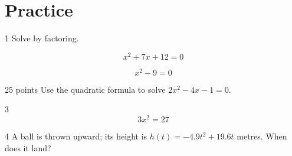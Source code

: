 \documentclass[11pt]{article}
\title{#1}\author{#2}\date{}%
\begin{document}

\section*{Practice}

\begin{clproblem}{1}{}
Solve by factoring.

\begin{clparts}
\item
\[
x^{2} + 7x + 12 = 0
\]
\item
\[
x^{2} - 9 = 0
\]
\end{clparts}
\end{clproblem}

\begin{clproblem}{2}{5 points}
Use the quadratic formula to solve \(2x^{2} - 4x - 1 = 0\).

\end{clproblem}

\begin{clproblem}{3}{}
\[
3x^{2} = 27
\]
\end{clproblem}

\begin{clproblem}{4}{}
A ball is thrown upward; its height is \(h(t) = -4.9t^{2} + 19.6t\) metres. When does it land?

\end{clproblem}
\end{document}

